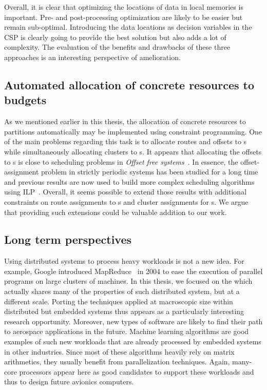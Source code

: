 \documentclass[main.tex]{subfiles}
\begin{document}
Overall, it is clear that optimizing the locations of data in local memories is important. Pre- and post-processing optimization are likely to be easier but remain sub-optimal. Introducing the data locations as decision variables in the CSP is clearly going to provide the best solution but also adds a lot of complexity. The evaluation of the benefits and drawbacks of these three approaches is an interesting perspective of amelioration.

\subsection{Automated allocation of concrete resources to budgets}
As we mentioned earlier in this thesis, the allocation of concrete resources to partitions automatically may be implemented using constraint programming. One of the main problems regarding this task is to allocate routes and offsets to \PC{}s while simultaneously allocating clusters to \PN{}s. It appears that allocating the offsets to \PC{}s is close to scheduling problems in \emph{Offset free systems}~\cite{Goossens03}. In essence, the offset-assignment problem in strictly periodic systems has been studied for a long time~\cite{Korst91} and previous results are now used to build more complex scheduling algorithms using ILP~\cite{Kermia09,Alsheikh11}. Overall, it seems possible to extend those results with additional constraints on route assignments to \PC{}s and cluster assignments for \PN{}s. We argue that providing such extensions could be valuable addition to our work.


\subsection{Long term perspectives}
Using distributed systems to process heavy workloads is not a new idea. 
For example, Google introduced MapReduce~\cite{Dean2004} in 2004 to ease the execution of parallel programs on large clusters of machines. In this thesis, we focused on the \mppalong which actually shares many of the properties of such distributed system, but at a different scale. Porting the techniques applied at macroscopic size within distributed but embedded systems thus appears as a particularly interesting research opportunity. Moreover, new types of software are likely to find their path to aerospace applications in the future. Machine learning algorithms are good examples of such new workloads that are already processed by embedded systems in other industries. Since most of these algorithms heavily rely on matrix arithmetics, they usually benefit from parallelization techniques. Again, many-core processors appear here as good candidates to support these workloads and thus to design future avionics computers. 


\subbiblio
\end{document}
